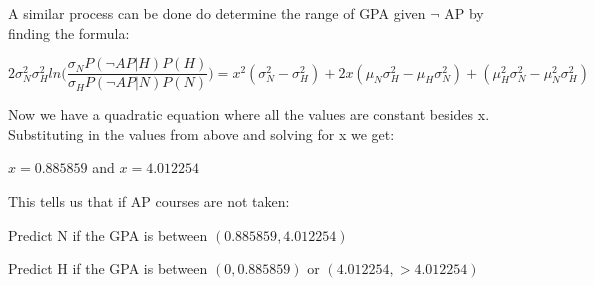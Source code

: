 \documentclass[11pt]{article}
\begin{document}
A similar process can be done do determine the range of GPA given $\neg$ AP by finding the formula:

\begin{center}
$2\sigma_N^2\sigma_H^2ln \bigg( \dfrac{\sigma_N P(\neg AP|H)P(H)}{\sigma_H P(\neg AP|N)P(N)} \bigg) = x^2(\sigma_N^2-\sigma_H^2) + 2x(\mu_N\sigma_H^2-\mu_H\sigma_N^2)+(\mu_H^2\sigma_N^2 - \mu_N^2\sigma_H^2)$
\end{center}

Now we have a quadratic equation where all the values are constant besides x. Substituting in the values from above and solving for x we get:

\begin{center}
$x = 0.885859$ and $x = 4.012254$
\end{center}

This tells us that if AP courses are not taken:\newline

Predict N if the GPA is between $(0.885859, 4.012254)$\newline

Predict H if the GPA is between $(0, 0.885859)$ or $(4.012254, >4.012254)$\newline
\end{document}
